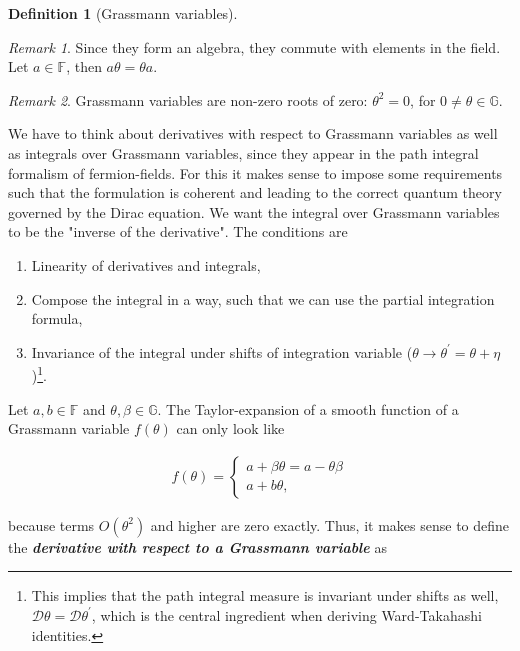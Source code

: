 \documentclass{article}
\theoremstyle{plain} %
\newtheorem{definition}{Definition}[section]
\theoremstyle{convention} %
\theoremstyle{remark} %
\newtheorem*{remark}{Remark} %
\def\df#1{\textbf{\textit{#1}}}
\numberwithin{equation}{section}
\begin{document}
\begin{appendix}
\begin{definition}[Grassmann variables]
\end{definition}

\begin{remark}
  Since they form an algebra, they commute with elements in the field. Let $a \in \mathbb{F}$, then $a \theta = \theta a$.
\end{remark}
\begin{remark}
  Grassmann variables are non-zero roots of zero: $\theta^2 = 0$, for $0 \ne \theta \in \mathbb{G}$.
\end{remark}

We have to think about derivatives with respect to Grassmann variables as well as integrals over Grassmann variables, since they appear in the path integral formalism of fermion-fields. For this it makes sense to impose some requirements such that the formulation is coherent and leading to the correct quantum theory governed by the Dirac equation. We want the integral over Grassmann variables to be the "inverse of the derivative". The conditions are

\begin{enumerate}
  \item Linearity of derivatives and integrals,
  \item Compose the integral in a way, such that we can use the partial integration formula,
  \item Invariance of the integral under shifts of integration variable ($\theta \rightarrow \theta^{\prime} = \theta + \eta$)\footnote{This implies that the path integral measure is invariant under shifts as well, $\mathcal{D} \theta = \mathcal{D} \theta^{\prime}$, which is the central ingredient when deriving Ward-Takahashi identities.}.
\end{enumerate}

Let $a,b \in \mathbb{F}$ and $\theta, \beta \in \mathbb{G}$. The Taylor-expansion of a smooth function of a Grassmann variable $f(\theta)$ can only look like

\begin{align*}
  f(\theta) = \left\{
      \begin{array}{ll}
          a + \beta \theta = a - \theta \beta \\
          a + b \theta,
      \end{array}
  \right.
\end{align*}

because terms $O(\theta^2)$ and higher are zero exactly. Thus, it makes sense to define the \df{derivative with respect to a Grassmann variable} as


\end{appendix}
\end{document}
